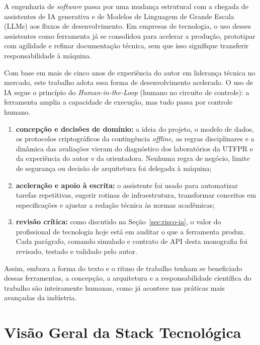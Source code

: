 A engenharia de \textit{software} passa por uma mudança estrutural com a chegada de assistentes de IA generativa e de Modelos de Linguagem de Grande Escala (LLMs) aos fluxos de desenvolvimento. Em empresas de tecnologia, o uso desses assistentes como ferramenta já se consolidou para acelerar a produção, prototipar com agilidade e refinar documentação técnica, sem que isso signifique transferir responsabilidade à máquina.

Com base em mais de cinco anos de experiência do autor em liderança técnica no mercado, este trabalho adota essa forma de desenvolvimento acelerado. O uso de IA segue o princípio do \textit{Human-in-the-Loop} (humano no circuito de controle): a ferramenta amplia a capacidade de execução, mas tudo passa por controle humano.

\begin{enumerate}
    \item \textbf{concepção e decisões de domínio:} a ideia do projeto, o modelo de dados, os protocolos criptográficos da contingência \textit{offline}, as regras disciplinares e a dinâmica das avaliações vieram do diagnóstico dos laboratórios da UTFPR e da experiência do autor e da orientadora. Nenhuma regra de negócio, limite de segurança ou decisão de arquitetura foi delegada à máquina;
    \item \textbf{aceleração e apoio à escrita:} o assistente foi usado para automatizar tarefas repetitivas, sugerir rotinas de infraestrutura, transformar conceitos em especificações e ajustar a redação técnica às normas acadêmicas;
    \item \textbf{revisão crítica:} como discutido na Seção~\ref{sec:risco-ia}, o valor do profissional de tecnologia hoje está em auditar o que a ferramenta produz. Cada parágrafo, comando simulado e contrato de API desta monografia foi revisado, testado e validado pelo autor.
\end{enumerate}

Assim, embora a forma do texto e o ritmo de trabalho tenham se beneficiado dessas ferramentas, a concepção, a arquitetura e a responsabilidade científica do trabalho são inteiramente humanas, como já acontece nas práticas mais avançadas da indústria.

\section{Visão Geral da Stack Tecnológica}
\label{sec:visao-stack}

